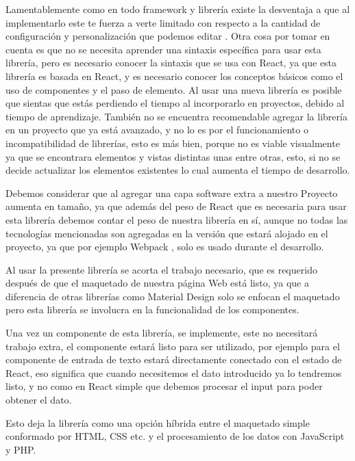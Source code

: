 Lamentablemente como en todo framework y librería existe la desventaja a que al implementarlo este te fuerza a verte limitado con respecto a la cantidad de configuración y personalización que podemos editar \cite{newTech}. Otra cosa por tomar en cuenta es que no se necesita aprender una sintaxis específica para usar esta librería, pero es necesario conocer la sintaxis que se usa con React, ya que esta librería es basada en React, y es necesario conocer los conceptos básicos como el uso de componentes y el paso de elemento. Al usar una nueva librería es posible que sientas que estás perdiendo el tiempo al incorporarlo en proyectos, debido al tiempo de aprendizaje. También no se encuentra recomendable agregar la librería en un proyecto que ya está avanzado, y no lo es por el funcionamiento o incompatibilidad de librerías, esto es más bien, porque no es viable visualmente ya que se encontrara elementos y vistas distintas unas entre otras, esto, si no se decide actualizar los elementos existentes lo cual aumenta el tiempo de desarrollo.


Debemos considerar que al agregar una capa software extra a nuestro Proyecto aumenta en tamaño, ya que además del peso de React que es necesaria para usar esta librería debemos contar el peso de nuestra librería en sí, aunque no todas  las tecnologías  mencionadas son agregadas en la versión que estará alojado en el proyecto, ya que por ejemplo Webpack \cite{webPack}, solo es usado durante el desarrollo.

Al usar la presente librería se acorta el trabajo necesario, que es requerido después de que el maquetado de nuestra página Web está listo, ya que a diferencia de otras librerías  como Material Design solo se enfocan el maquetado pero esta librería se involucra en la funcionalidad de los componentes.

Una vez un componente de esta librería, se implemente,  este no necesitará trabajo extra, el componente estará listo para ser utilizado, por ejemplo para el componente de entrada de texto estará directamente conectado con el estado de React, eso significa que cuando necesitemos el dato introducido ya lo tendremos listo, y no como en React simple que debemos procesar el input para poder obtener el dato.

Esto deja la librería como una opción híbrida entre el maquetado simple conformado por HTML, CSS etc. y el procesamiento de los datos con JavaScript y PHP.

\newpage